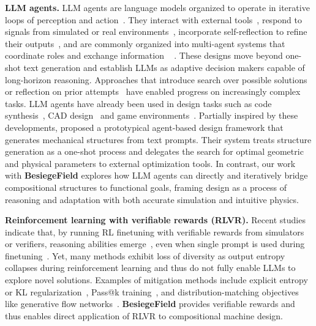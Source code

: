 \documentclass{article} %
\newcommand{\envname}{\textbf{BesiegeField}\xspace}
\theoremstyle{plain}
\theoremstyle{definition}
\begin{document}
\textbf{LLM agents.} LLM agents are language models organized to operate in iterative loops of perception and action~\citep{yao2023react,minaee2024large,hu2024scenecraft}. They interact with external tools~\citep{schick2023toolformer,liu2024toolnet,kim2024leveraging,qin2024toolllm}, respond to signals from simulated or real environments~\citep{savva2019habitat,shridhar2020alfworld}, incorporate self-reflection to refine their outputs~\citep{hu20243d,alrashedy2025generating,shinn2023reflexion,yu2025generating}, and are commonly organized into multi-agent systems that coordinate roles and exchange information
~\citep{li2023camel,chen2024agentverse,zhang2024aflow}
. These designs move beyond one-shot text generation and establish LLMs as adaptive decision makers capable of long-horizon reasoning. Approaches that introduce search over possible solutions~\citep{yao2023tree,putta2024agent,koh2024tree} or reflection on prior attempts~\citep{besta2024graph,deng2024multi,renze2024self,xiao2025verbalized,yu2025generating} have enabled progress on increasingly complex tasks. 
LLM agents have already been used in design tasks such as code synthesis~\citep{gao2023pal,novikov2025alphaevolve,madaan2023self}, CAD design~\citep{alrashedy2025generating} and game environments~\citep{wang2023voyager,fan2022minedojo}. 
Partially inspired by these developments, \citet{makatura2023can} proposed a prototypical agent-based design framework that generates mechanical structures from text prompts. Their system treats structure generation as a one-shot process and delegates the search for optimal geometric and physical parameters to external optimization tools. In contrast, our work with \envname explores how LLM agents can directly and iteratively bridge compositional structures to functional goals, framing design as a process of reasoning and adaptation with both accurate simulation and intuitive physics.


\textbf{Reinforcement learning with verifiable rewards (RLVR).} Recent studies indicate that, by running RL finetuning with verifiable rewards from simulators or verifiers, reasoning abilities emerge~\citep{shao2024deepseekmath,guo2025deepseek,bai2022constitutional}, even when single prompt is used during finetuning~\citep{wang2025reinforcement}.
Yet, many methods exhibit loss of diversity as output entropy collapses during reinforcement learning and thus do not fully enable LLMs to explore novel solutions. Examples of mitigation methods include explicit entropy or KL regularization~\citep{cui2025entropy,ouyang2022training}, Pass@k training~\citep{tang2025optimizing,chen2025pass}, and distribution-matching objectives like generative flow networks~\citep{zhu2025flowrl,hu2023amortizing}. 
\envname provides verifiable rewards and thus enables direct application of RLVR to compositional machine design.
\end{document}
